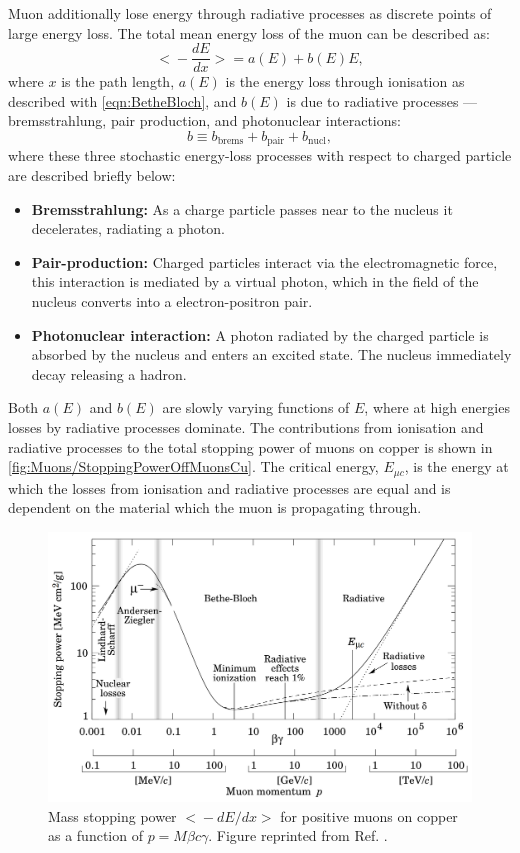 Muon additionally lose energy through radiative processes as discrete points of large energy loss. The total mean energy loss of the muon can be described as:
\begin{equation}\label{eqn:totMeanEnergyLossMu}
    \Biggl<-\frac{dE}{dx}\Biggl>=a(E)+b(E)E,
\end{equation}
where $x$ is the path length, $a(E)$ is the energy loss through ionisation as described with \autoref{eqn:BetheBloch}, and $b(E)$ is due to radiative
processes — bremsstrahlung, pair production, and photonuclear interactions:
\begin{equation}\label{eqn:radproc}
    b\equiv b_{\text{brems}}+b_{\text{pair}}+b_{\text{nucl}},
\end{equation}
where these three stochastic energy-loss processes with respect to charged particle are described briefly below:
\begin{itemize}
    \item \textbf{Bremsstrahlung:} As a charge particle passes near to the nucleus it decelerates, radiating a photon.
    \item \textbf{Pair-production:} Charged particles interact via the electromagnetic force, this interaction is mediated by a virtual photon, which in the field of the nucleus converts into a electron-positron pair.
    \item \textbf{Photonuclear interaction:} A photon radiated by the charged particle is absorbed by the nucleus and enters an excited state. The nucleus immediately decay releasing a hadron.
\end{itemize}
Both $a(E)$ and $b(E)$ are slowly varying functions of $E$, where at high energies losses by radiative processes dominate. The contributions from ionisation and radiative processes to the total stopping power of muons on copper is shown in \autoref{fig:Muons/StoppingPowerOffMuonsCu}. The critical energy, $E_{\mu c}$, is the energy at which the losses from ionisation and radiative processes are equal and is dependent on the material which the muon is propagating through.
\begin{figure}
    \centering
    \includegraphics[width=0.9\linewidth]{figures/Muons/MassMuonStoppingPowerOfMuonsOnCu.png}
    \caption{Mass stopping power $\big<-dE/dx\big>$ for positive muons on copper as a function of $p=M\beta c\gamma$. Figure reprinted from Ref. \cite{GROOM2001183}.}
    \label{fig:Muons/StoppingPowerOffMuonsCu}
\end{figure}
